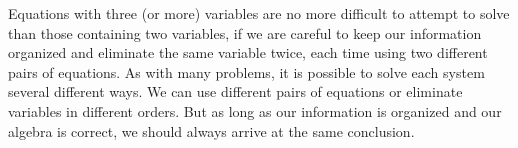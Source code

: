 Equations with three (or more) variables are no more difficult to attempt to solve than those containing two
variables, if we are careful to keep our information organized and eliminate
the same variable twice, each time using two different pairs of equations. As with many problems, it is possible to solve each system several different ways. We can use different pairs of
equations or eliminate variables in different orders.  But as long as our
information is organized and our algebra is correct, we should always arrive at the
same conclusion.

%
